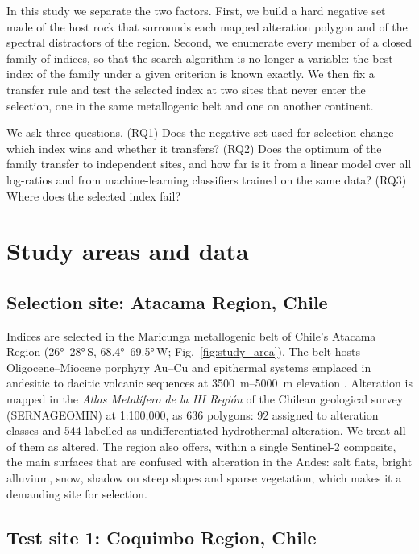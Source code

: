 \documentclass[preprint,authoryear,number]{elsarticle}
\begin{document}
In this study we separate the two factors. First, we build a hard negative set made of the host rock that surrounds each mapped alteration polygon and of the spectral distractors of the region. Second, we enumerate every member of a closed family of indices, so that the search algorithm is no longer a variable: the best index of the family under a given criterion is known exactly. We then fix a transfer rule and test the selected index at two sites that never enter the selection, one in the same metallogenic belt and one on another continent.

We ask three questions. (RQ1) Does the negative set used for selection change which index wins and whether it transfers? (RQ2) Does the optimum of the family transfer to independent sites, and how far is it from a linear model over all log-ratios and from machine-learning classifiers trained on the same data? (RQ3) Where does the selected index fail?

\section{Study areas and data}
\label{sec:data}

\subsection{Selection site: Atacama Region, Chile}

Indices are selected in the Maricunga metallogenic belt of Chile's Atacama Region (\ang{26}--\ang{28}\,S, \ang{68.4}--\ang{69.5}\,W; Fig.~\ref{fig:study_area}). The belt hosts Oligocene--Miocene porphyry Au--Cu and epithermal systems emplaced in andesitic to dacitic volcanic sequences at \SIrange{3500}{5000}{\meter} elevation \citep{Sillitoe1991,Vila1991}. Alteration is mapped in the \emph{Atlas Metal\'ifero de la III Regi\'on} of the Chilean geological survey (SERNAGEOMIN) at 1:100{,}000, as 636 polygons: 92 assigned to alteration classes and 544 labelled as undifferentiated hydrothermal alteration. We treat all of them as altered. The region also offers, within a single Sentinel-2 composite, the main surfaces that are confused with alteration in the Andes: salt flats, bright alluvium, snow, shadow on steep slopes and sparse vegetation, which makes it a demanding site for selection.

\subsection{Test site 1: Coquimbo Region, Chile}
\end{document}
